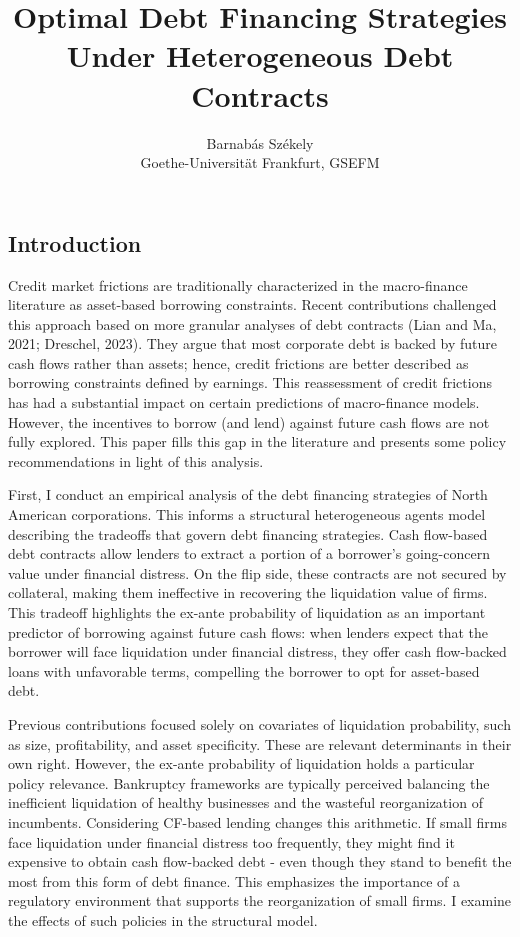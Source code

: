 \documentclass[12pt]{article}
\title{\vspace{-0.5cm} Optimal Debt Financing Strategies Under Heterogeneous Debt Contracts}
\author{Barnabás Székely \\ \small  Goethe-Universität Frankfurt, GSEFM}
\date{}
\begin{document}
\maketitle


\subsection*{Introduction} \label{sec:introduction}

Credit market frictions are traditionally characterized in the macro-finance literature as asset-based borrowing constraints. Recent contributions  challenged this approach based on more granular analyses of debt contracts (Lian and Ma, 2021; Dreschel, 2023). They argue that most corporate debt is backed by future cash flows rather than assets; hence, credit frictions are better described as borrowing constraints defined by earnings. This reassessment of credit frictions has had a substantial impact on certain predictions of macro-finance models. However, the incentives to borrow (and lend) against future cash flows are not fully explored. This paper fills this gap in the literature and presents some policy recommendations in light of this analysis. 

First, I conduct an empirical analysis of the debt financing strategies of North American corporations. This informs a structural heterogeneous agents model describing the tradeoffs that govern debt financing strategies. Cash flow-based debt contracts allow lenders to extract a portion of a borrower's going-concern value under financial distress. On the flip side, these contracts are not secured by collateral, making them ineffective in recovering the liquidation value of firms. This tradeoff highlights the ex-ante probability of liquidation as an important predictor of borrowing against future cash flows: when lenders expect that the borrower will face liquidation under financial distress, they offer cash flow-backed loans with unfavorable terms, compelling the borrower to opt for asset-based debt.

Previous contributions focused solely on covariates of liquidation probability, such as size, profitability, and asset specificity. These are relevant determinants in their own right. However, the ex-ante probability of liquidation holds a particular policy relevance. Bankruptcy frameworks are typically perceived balancing the inefficient liquidation of healthy businesses and the wasteful reorganization of incumbents. Considering CF-based lending changes this arithmetic. If small firms face liquidation under financial distress too frequently, they might find it expensive to obtain cash flow-backed debt - even though they stand to benefit the most from this form of debt finance. This emphasizes the importance of a regulatory environment that supports the reorganization of small firms. I examine the effects of such policies in the structural model.
\end{document}
